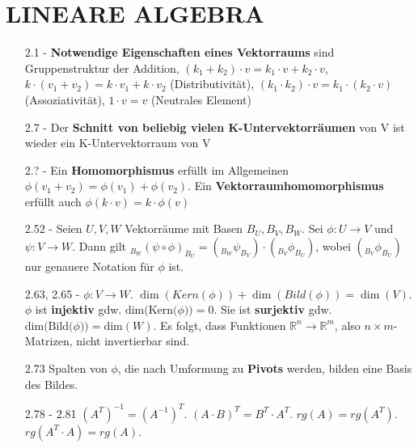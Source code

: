 \documentclass{scrartcl}
\begin{document}
\section*{LINEARE ALGEBRA}
\begin{itemize}
    \item [2.1] - \textbf{Notwendige Eigenschaften eines Vektorraums} sind Gruppenstruktur der Addition, $(k_1 + k_2) \cdot v = k_1 \cdot v + k_2 \cdot v$, $ k\cdot (v_1 + v_2) = k \cdot v_1 + k \cdot v_2$ (Distributivität), $(k_1 \cdot k_2) \cdot v = k_1 \cdot (k_2 \cdot v)$ (Assoziativität), $1 \cdot v = v$ (Neutrales Element)
    \item [2.7] - Der \textbf{Schnitt von beliebig vielen K-Untervektorräumen} von V ist wieder ein K-Untervektorraum von V
    \item [2.?] - Ein \textbf{Homomorphismus} erfüllt im Allgemeinen $\phi(v_1 + v_2) = \phi(v_1) + \phi(v_2)$. Ein \textbf{Vektorraumhomomorphismus} erfüllt auch $\phi(k\cdot v) = k\cdot\phi(v)$
    
    
    \item [2.52] - Seien $U,V,W$ Vektorräume mit Basen $B_U, B_V, B_W$. Sei $\phi: U \to V$ und $\psi: V \to W$. Dann gilt $_{B_W}(\psi \circ \phi)_{B_U} = (_{B_W}\psi_{B_V}) \cdot (_{B_V}\phi_{B_U})$, wobei $(_{B_V}\phi_{B_U})$ nur genauere Notation für $\phi$ ist.
    
    \item [2.63, 2.65] - $\phi: V \to W$. $\dim(Kern(\phi)) + \dim(Bild(\phi)) = \dim(V)$. $\phi$ ist \textbf{injektiv} gdw. $\text{dim(Kern(}\phi)) = 0$. Sie ist \textbf{surjektiv} gdw. $\text{dim(Bild(}\phi)) = \text{dim}(W)$. Es folgt, dass Funktionen $\mathbb{R}^n \to \mathbb{R}^m$, also $n \times m$-Matrizen, nicht invertierbar sind.
    
    \item [2.73] Spalten von $\phi$, die nach Umformung zu \textbf{Pivots} werden, bilden eine Basis des Bildes.

    \item [2.78 - 2.81] $(A^T)^{-1} = (A^{-1})^T$. $(A \cdot B)^T = B^T \cdot A^T$. $rg(A) = rg(A^T)$. $rg(A^T \cdot A) = rg(A)$.


\end{itemize}
\end{document}
